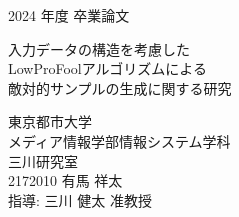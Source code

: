 
\begin{center}

    {\Large 2024 年度 卒業論文} %
    \vspace{3cm}

    {\LARGE 入力データの構造を考慮した\\LowProFoolアルゴリズムによる\\敵対的サンプルの生成に関する研究} %
    \vspace{5cm}

    \begin{flushright}
        {\large 東京都市大学} \\
        {\large メディア情報学部情報システム学科} \\
        {\large 三川研究室} \\
        {\large 2172010 有馬 祥太} \\
        {\large 指導: 三川 健太 准教授} \\
    \end{flushright}

\end{center}
